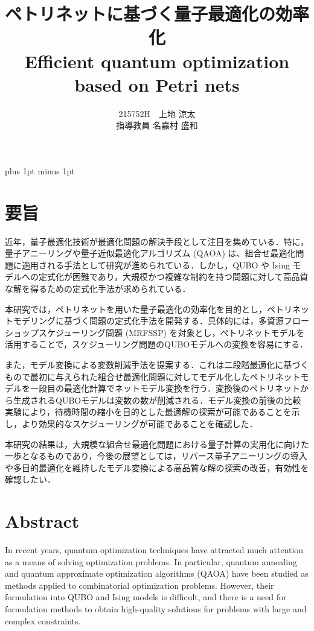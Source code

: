 \documentclass[a4j,12pt]{jreport}
\title{ペトリネットに基づく量子最適化の効率化\\
Efficient quantum optimization based on Petri nets}
\author{215752H　上地 涼太  \\ 指導教員 {名嘉村 盛和} }
\begin{document}
\maketitle
\baselineskip 17pt plus 1pt minus 1pt


\setcounter{page}{0}

\section*{要旨}
近年，量子最適化技術が最適化問題の解決手段として注目を集めている．特に，量子アニーリングや量子近似最適化アルゴリズム (QAOA) は、組合せ最適化問題に適用される手法として研究が進められている．しかし，QUBO  や Ising モデルへの定式化が困難であり，大規模かつ複雑な制約を持つ問題に対して高品質な解を得るための定式化手法が求められている．

本研究では，ペトリネットを用いた量子最適化の効率化を目的とし，ペトリネットモデリングに基づく問題の定式化手法を開発する．具体的には，多資源フローショップスケジューリング問題 (MRFSSP) を対象とし，ペトリネットモデルを活用することで，スケジューリング問題のQUBOモデルへの変換を容易にする．

また，モデル変換による変数削減手法を提案する．これは二段階最適化に基づくもので最初に与えられた組合せ最適化問題に対してモデル化したペトリネットモデルを一段目の最適化計算でネットモデル変換を行う．変換後のペトリネットから生成されるQUBOモデルは変数の数が削減される．モデル変換の前後の比較実験により，待機時間の縮小を目的とした最適解の探索が可能であることを示し，より効果的なスケジューリングが可能であることを確認した．

本研究の結果は，大規模な組合せ最適化問題における量子計算の実用化に向けた一歩となるものであり，今後の展望としては，リバース量子アニーリングの導入や多目的最適化を維持したモデル変換による高品質な解の探索の改善，有効性を確認したい．

\clearpage
\section*{Abstract}
In recent years, quantum optimization techniques have attracted much attention as a means of solving optimization problems. In particular, quantum annealing and quantum approximate optimization algorithms (QAOA) have been studied as methods applied to combinatorial optimization problems. However, their formulation into QUBO and Ising models is difficult, and there is a need for formulation methods to obtain high-quality solutions for problems with large and complex constraints.
\end{document}
